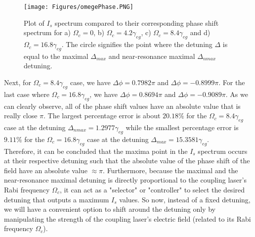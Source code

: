 \begin{figure}[h!]
    \centering
    \texttt{[image: Figures/omegePhase.PNG]}
    \caption{Plot of $I_{s}$ spectrum compared to their corresponding phase shift spectrum for a) $\Omega_{c} = 0$, b) $\Omega_{c} = 4.2\gamma_{eg}$, c) $\Omega_{c} = 8.4\gamma_{eg}$ and d) $\Omega_{c} = 16.8\gamma_{eg}$. The circle signifies the point where the detuning $\Delta$ is equal to the maximal $\Delta_{max}$ and near-resonance maximal $\Delta_{nmax}$ detuning.}
    \label{fig: omegaPhase}
\end{figure}

\noindent Next,  for $\Omega_{c} = 8.4\gamma_{eg}$ case, we have $\Delta\phi = 0.7982\pi$ and $\Delta\phi = -0.8999\pi$. For the last case where $\Omega_{c} = 16.8\gamma_{eg}$, we have $\Delta\phi = 0.8694\pi$ and $\Delta\phi = -0.9089\pi$. As we can clearly observe, all of the phase shift values have an absolute value that is really close $\pi$. The largest percentage error is about $20.18\%$ for the $\Omega_{c} = 8.4\gamma_{eg}$ case at the detuning $\Delta_{nmax} = 1.2977\gamma_{eg}$ while the smallest percentage error is $9.11\%$ for the $\Omega_{c} = 16.8\gamma_{eg}$ case at the detuning $\Delta_{max} = 15.3581\gamma_{eg}$.\\

Therefore, it can be concluded that the maxima point in the $I_{s}$ spectrum occurs at their respective detuning such that the absolute value of the phase shift of the field have an absolute value $\approx \pi$. Furthermore, because the maximal and the near-resonance maximal detuning is directly proportional to the coupling laser's Rabi frequency $\Omega_{c}$, it can act as a "selector" or "controller" to select the desired detuning that outputs a maximum $I_{s}$ values. So now, instead of a fixed detuning, we will have a convenient option to shift around the detuning only by manipulating the strength of the coupling laser's electric field (related to its Rabi frequency $\Omega_{c}$).

